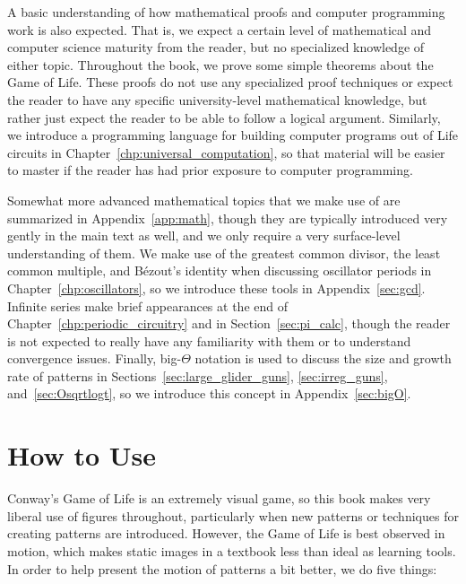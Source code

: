 A basic understanding of how mathematical proofs and computer programming work is also expected. That is, we expect a certain level of mathematical and computer science maturity from the reader, but no specialized knowledge of either topic. Throughout the book, we prove some simple theorems about the Game of Life. These proofs do not use any specialized proof techniques or expect the reader to have any specific university-level mathematical knowledge, but rather just expect the reader to be able to follow a logical argument. Similarly, we introduce a programming language for building computer programs out of Life circuits in Chapter~\ref{chp:universal_computation}, so that material will be easier to master if the reader has had prior exposure to computer programming.

Somewhat more advanced mathematical topics that we make use of are summarized in Appendix~\ref{app:math}, though they are typically introduced very gently in the main text as well, and we only require a very surface-level understanding of them. We make use of the greatest common divisor, the least common multiple, and B\'ezout's identity when discussing oscillator periods in Chapter~\ref{chp:oscillators}, so we introduce these tools in Appendix~\ref{sec:gcd}. Infinite series make brief appearances at the end of Chapter~\ref{chp:periodic_circuitry} and in Section~\ref{sec:pi_calc}, though the reader is not expected to really have any familiarity with them or to understand convergence issues. Finally, big-$\Theta$ notation is used to discuss the size and growth rate of patterns in Sections~\ref{sec:large_glider_guns}, \ref{sec:irreg_guns}, and~\ref{sec:Osqrtlogt}, so we introduce this concept in Appendix~\ref{sec:bigO}.


\section*{How to Use}

Conway's Game of Life is an extremely visual game, so this book makes very liberal use of figures throughout, particularly when new patterns or techniques for creating patterns are introduced. However, the Game of Life is best observed in motion, which makes static images in a textbook less than ideal as learning tools. In order to help present the motion of patterns a bit better, we do five things:\medskip

